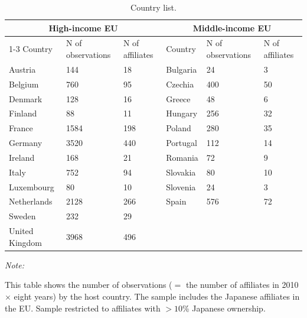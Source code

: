 \begin{table}[!ht]
\centering
\caption{\label{tab:country-list}Country list.}
\centering
\begin{threeparttable}
\begin{tabular}[t]{llllll}
\hline
\multicolumn{3}{c}{High-income EU} & \multicolumn{3}{c}{Middle-income EU} \\
\cline{1-3} \cline{4-6}
Country & N of observations & N of affiliates & Country & N of observations & N of affiliates\\
\hline
Austria & 144 & 18 & Bulgaria & 24 & 3\\
Belgium & 760 & 95 & Czechia & 400 & 50\\
Denmark & 128 & 16 & Greece & 48 & 6\\
Finland & 88 & 11 & Hungary & 256 & 32\\
France & 1584 & 198 & Poland & 280 & 35\\
Germany & 3520 & 440 & Portugal & 112 & 14\\
Ireland & 168 & 21 & Romania & 72 & 9\\
Italy & 752 & 94 & Slovakia & 80 & 10\\
Luxembourg & 80 & 10 & Slovenia & 24 & 3\\
Netherlands & 2128 & 266 & Spain & 576 & 72\\
Sweden & 232 & 29 &  &  & \\
United Kingdom & 3968 & 496 &  &  & \\
\hline
\end{tabular}
\begin{tablenotes}
\item \textit{Note: } 
\item This table shows the number of observations ($=$ the number of affiliates in 2010 $\times$ eight years) by the host country. The sample includes the Japanese affiliates in the EU. Sample restricted to affiliates with $>10$\% Japanese ownership.
\end{tablenotes}
\end{threeparttable}
\end{table}
